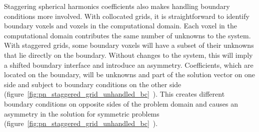 Staggering spherical harmonics coefficients also makes handling boundary conditions more involved. With collocated grids, it is straightforward to identify boundary voxels and voxels in the computational domain. Each voxel in the computational domain contributes the same number of unknowns to the system. With staggered grids, some boundary voxels will have a subset of their unknowns that lie directly on the boundary. Without changes to the system, this will imply a shifted boundary interface and introduce an asymmetry. Coefficients, which are located on the boundary, will be unknowns and part of the solution vector on one side and subject to boundary conditions on the other side (figure~\ref{fig:pn_staggered_grid_unhandled_bc}~). This creates different boundary conditions on opposite sides of the problem domain and causes an asymmetry in the solution for symmetric problems (figure~\ref{fig:pn_staggered_grid_unhandled_bc}~).
